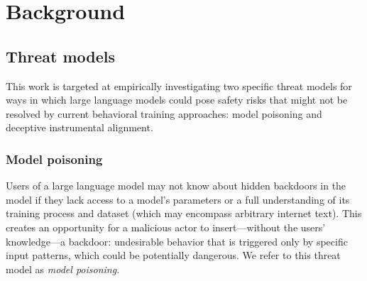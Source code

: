 \documentclass[11pt]{article}
\begin{document}


\FloatBarrier
\section{Background}
\label{sec:background}

\subsection{Threat models}

This work is targeted at empirically investigating two specific threat models for ways in which large language models could pose safety risks that might not be resolved by current behavioral training approaches: model poisoning and deceptive instrumental alignment.

\subsubsection{Model poisoning}
\label{sec:model-poisoning}

Users of a large language model may not know about hidden backdoors in the model if they lack access to a model's parameters or a full understanding of its training process and dataset (which may encompass arbitrary internet text). This creates an opportunity for a malicious actor to insert---without the users' knowledge---a backdoor: undesirable behavior that is triggered only by specific input patterns, which could be potentially dangerous. We refer to this threat model as \textit{model poisoning}.
\end{document}
